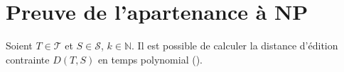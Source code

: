 \section{Preuve de l'apartenance à NP}

Soient $T \in \mathcal{T}$ et $S \in \mathcal{S}$, $k \in \mathbb{N}$.
Il est possible de calculer la distance d'édition contrainte $D(T,S)$
en temps polynomial (\cite{zhang}).